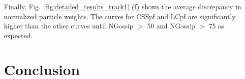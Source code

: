 \documentclass[10pt,letterpaper,final]{article}
\begin{document}
Finally, Fig.~\ref{fig:detailed_results_track1} (f) shows the average discrepancy in normalized particle weights. The curves for CSSpf and LCpf are significantly higher than the other curves until NGossip $>$ 50 and NGossip $>$ 75 as expected. 





\section{Conclusion}



\end{document}
